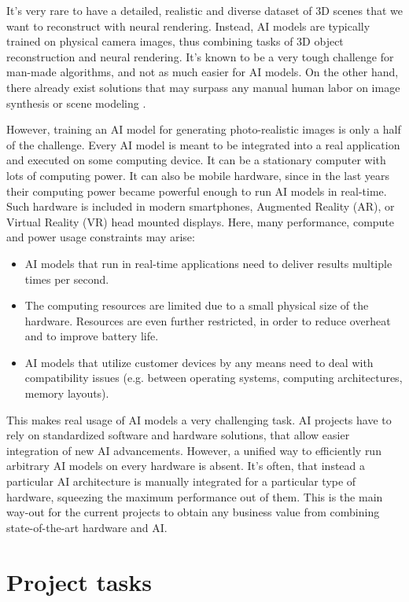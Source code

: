 It's very rare to have a detailed, realistic and diverse dataset of 3D scenes that we want to reconstruct with neural rendering. Instead, AI models are typically trained on physical camera images, thus combining tasks of 3D object reconstruction and neural rendering. It's known to be a very tough challenge for man-made algorithms, and not as much easier for AI models. On the other hand, there already exist solutions that may surpass any manual human labor on image synthesis or scene modeling \cite{dnn:stylegan-v1-19,dnn:stylegan-v2-20,dnn:stylegan-v3-21,dnn:nerf20}.
 
However, training an AI model for generating photo-realistic images is only a half of the challenge. Every AI model is meant to be integrated into a real application and executed on some computing device. It can be a stationary computer with lots of computing power. It can also be mobile hardware, since in the last years their computing power became powerful enough to run AI models in real-time. Such hardware is included in modern smartphones, Augmented Reality (AR), or Virtual Reality (VR) head mounted displays. Here, many performance, compute and power usage constraints may arise:
\begin{itemize}
	\item  AI models that run in real-time applications need to deliver results multiple times per second.
	\item  The computing resources are limited due to a small physical size of the hardware. Resources are even further restricted, in order to reduce overheat and to improve battery life.
	\item  AI models that utilize customer devices by any means need to deal with compatibility issues (e.g. between operating systems, computing architectures, memory layouts).
\end{itemize}

This makes real usage of AI models a very challenging task. AI projects have to rely on standardized software and hardware solutions, that allow easier integration of new AI advancements. However, a unified way to efficiently run arbitrary AI models on every hardware is absent. It's often, that instead a particular AI architecture is manually integrated for a particular type of hardware, squeezing the maximum performance out of them. This is the main way-out for the current projects to obtain any business value from combining state-of-the-art hardware and AI.
 
\section{Project tasks}\label{intro:task}
 
